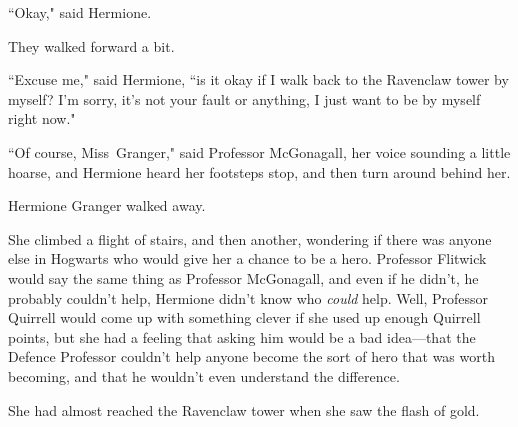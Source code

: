 ``Okay," said Hermione.

They walked forward a bit.

``Excuse me," said Hermione, ``is it okay if I walk back to the Ravenclaw tower by myself? I'm sorry, it's not your fault or anything, I just want to be by myself right now."

``Of course, Miss~Granger," said Professor McGonagall, her voice sounding a little hoarse, and Hermione heard her footsteps stop, and then turn around behind her.

Hermione Granger walked away.

She climbed a flight of stairs, and then another, wondering if there was anyone else in Hogwarts who would give her a chance to be a hero. Professor Flitwick would say the same thing as Professor McGonagall, and even if he didn't, he probably couldn't help, Hermione didn't know who \emph{could} help. Well, Professor Quirrell would come up with something clever if she used up enough Quirrell points, but she had a feeling that asking him would be a bad idea—that the Defence Professor couldn't help anyone become the sort of hero that was worth becoming, and that he wouldn't even understand the difference.

She had almost reached the Ravenclaw tower when she saw the flash of gold.

